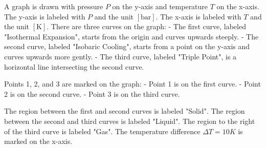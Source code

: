 A graph is drawn with pressure \( P \) on the y-axis and temperature \( T \) on the x-axis. The y-axis is labeled with \( P \) and the unit \([ \text{bar} ]\). The x-axis is labeled with \( T \) and the unit \([ \text{K} ]\). There are three curves on the graph:
- The first curve, labeled "Isothermal Expansion", starts from the origin and curves upwards steeply.
- The second curve, labeled "Isobaric Cooling", starts from a point on the y-axis and curves upwards more gently.
- The third curve, labeled "Triple Point", is a horizontal line intersecting the second curve.

Points 1, 2, and 3 are marked on the graph:
- Point 1 is on the first curve.
- Point 2 is on the second curve.
- Point 3 is on the third curve.

The region between the first and second curves is labeled "Solid".
The region between the second and third curves is labeled "Liquid".
The region to the right of the third curve is labeled "Gas".
The temperature difference \(\Delta T = 10K\) is marked on the x-axis.